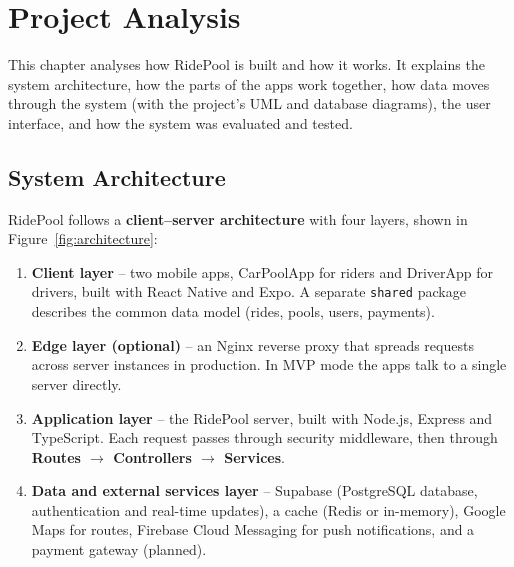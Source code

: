 \chapter{Project Analysis}
\label{ch:project-analysis}

This chapter analyses how RidePool is built and how it works. It explains the
system architecture, how the parts of the apps work together, how data moves
through the system (with the project's UML and database diagrams), the user
interface, and how the system was evaluated and tested.

\section{System Architecture}
\label{sec:architecture}

RidePool follows a \textbf{client--server architecture} with four layers, shown
in Figure~\ref{fig:architecture}:

\begin{enumerate}
  \item \textbf{Client layer} -- two mobile apps, CarPoolApp for riders and
        DriverApp for drivers, built with React Native and Expo. A separate
        \texttt{shared} package describes the common data model (rides, pools,
        users, payments).
  \item \textbf{Edge layer (optional)} -- an Nginx reverse proxy that spreads
        requests across server instances in production. In MVP mode the apps
        talk to a single server directly.
  \item \textbf{Application layer} -- the RidePool server, built with Node.js,
        Express and TypeScript. Each request passes through security
        middleware, then through \textbf{Routes $\rightarrow$ Controllers
        $\rightarrow$ Services}.
  \item \textbf{Data and external services layer} -- Supabase (PostgreSQL
        database, authentication and real-time updates), a cache (Redis or
        in-memory), Google Maps for routes, Firebase Cloud Messaging for push
        notifications, and a payment gateway (planned).
\end{enumerate}

